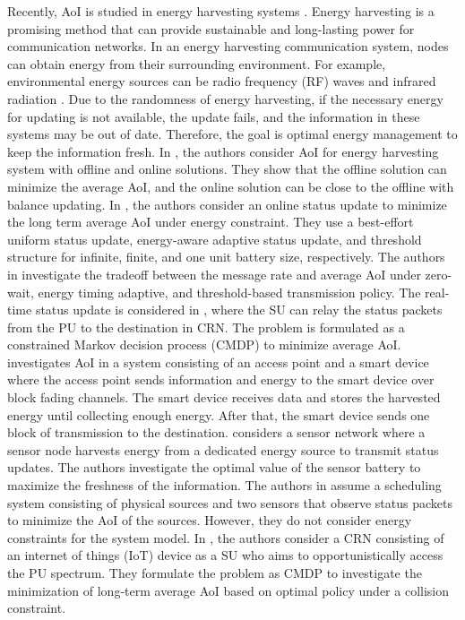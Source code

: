\documentclass[journal]{IEEEtran}
\begin{document}
		Recently, AoI is studied in energy harvesting systems \cite{Age_13,Scheduling_14}. Energy harvesting is a promising method that can provide sustainable and long-lasting power for communication networks. In an energy harvesting communication system, nodes can obtain energy from their surrounding environment. For example, environmental energy sources can be radio frequency (RF) waves and infrared radiation \cite{Energy_15}. Due to the randomness of energy harvesting, if the necessary energy for updating is not available, the update fails, and the information in these systems may be out of date. Therefore, the goal is optimal energy management to keep the information fresh. In \cite{Age_13}, the authors consider AoI for energy harvesting system with offline and online solutions. They show that the offline solution can minimize the average AoI, and the online solution can be close to the offline with balance updating. In \cite{Optimal_17}, the authors consider an online status update to minimize the long term average AoI under energy constraint. They use a best-effort uniform status update, energy-aware adaptive status update, and threshold structure for infinite, finite, and one unit battery size, respectively. The authors in \cite{Sending_18} investigate the tradeoff between the message rate and average AoI under zero-wait, energy timing adaptive, and threshold-based transmission policy. The real-time status update is considered in \cite{Age_26}, where the SU can relay the status packets from the PU to the destination in CRN. The problem is formulated as a constrained Markov decision process (CMDP) to minimize average AoI. \cite{Age_27} investigates AoI in a system consisting of an access point and a smart device where the access point sends information and energy to the smart device over block fading channels. The smart device receives data and stores the harvested energy until collecting enough energy. After that, the smart device sends one block of transmission to the destination. \cite{Average_28} considers a sensor network where a sensor node harvests energy from a dedicated energy source to transmit status updates. The authors investigate the optimal value of the sensor battery to maximize the freshness of the information. The authors in \cite{Minimizing_29} assume a scheduling system consisting of physical sources and two sensors that observe status packets to minimize the AoI of the sources. However, they do not consider energy constraints for the system model. In \cite{Minimizing_30}, the authors consider a CRN consisting of an internet of things (IoT) device as a SU who aims to opportunistically access the PU spectrum. They formulate the problem as CMDP to investigate the minimization of long-term average AoI based on optimal policy under a collision constraint.
		
\end{document}
